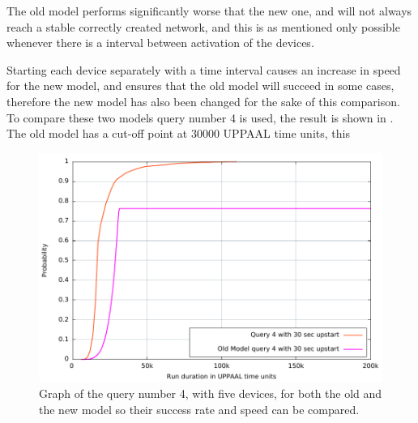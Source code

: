 \newpage
\noindent
The old model performs significantly worse that the new one, and will not always reach a stable correctly created network, and this is as mentioned only possible whenever there is a interval between activation of the devices.

Starting each device separately with a time interval causes an increase in speed for the new model, and ensures that the old model will succeed in some cases, therefore the new model has also been changed for the sake of this comparison. 
To compare these two models query number 4 is used, the result is shown in .
The old model has a cut-off point at $30 000$ UPPAAL time units, this

\begin{figure}[ht]
  \includegraphics[width=1\textwidth]{Figures/Graphs/gnuplot/uppaal_Compare/graph.pdf} 
\caption{Graph of the query number 4, with five devices, for both the old and the new model so their success rate and speed can be compared.}
\label{CompareGraph}
\end{figure}

